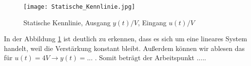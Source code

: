 \begin{figure}[h]
	\begin{center}
		\texttt{[image: Statische\_Kennlinie.jpg]}
		\caption{Statische Kennlinie, Ausgang $y(t)/V$, Eingang $u(t)/V$}
       \label{StatKenn}
	\end{center} 
\end{figure}

In der Abbildung \ref{StatKenn} ist deutlich zu erkennen, dass es sich um eine lineares System handelt, weil die Verstärkung konstant bleibt. Außerdem können wir ablesen das für $u(t) = 4V \rightarrow y(t) = ...$ . Somit beträgt der Arbeitspunkt $.....$ 